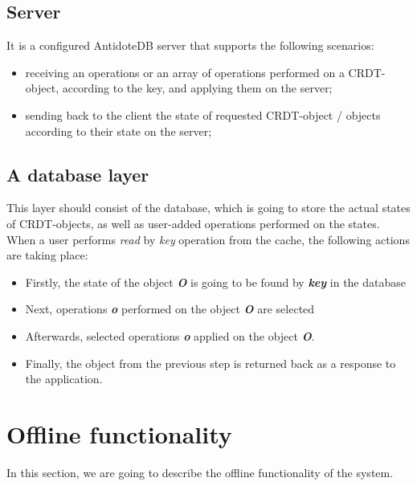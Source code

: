 \subsection{Server}

It is a configured AntidoteDB server that supports the following scenarios:

\begin{itemize}
    \item receiving an operations or an array of operations performed on a CRDT-object, according to the key, and applying them on the server;
    \item sending back to the client the state of requested CRDT-object / objects according to their state on the server;
\end{itemize}

\subsection{A database layer}

This layer should consist of the database, which is going to store the actual states of CRDT-objects, as well as user-added operations performed on the states.
When a user performs \textit{read} by \textit{key} operation from the cache, the following actions are taking place:

\begin{itemize}
\item Firstly, the state of the object \textit{\textbf{O}} is going to be found by \textit{\textbf{key}} in the database
\item Next, operations \textit{\textbf{o}} performed on the object \textit{\textbf{O}} are selected
\item Afterwards, selected operations \textit{\textbf{o}} applied on the object \textit{\textbf{O}}.
\item Finally, the object from the previous step is returned back as a response to the application.
\end{itemize} 

\section{Offline functionality}

In this section, we are going to describe the offline functionality of the system.

